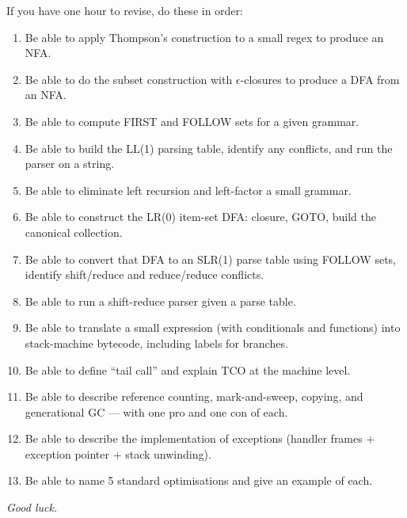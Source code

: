 \documentclass[11pt,a4paper]{article}
\begin{document}
\begin{must}
If you have one hour to revise, do these in order:
\begin{enumerate}[leftmargin=*,itemsep=2pt]
  \item Be able to apply Thompson's construction to a small regex to produce an NFA.
  \item Be able to do the subset construction with $\epsilon$-closures to produce a DFA from an NFA.
  \item Be able to compute FIRST and FOLLOW sets for a given grammar.
  \item Be able to build the LL(1) parsing table, identify any conflicts, and run the parser on a string.
  \item Be able to eliminate left recursion and left-factor a small grammar.
  \item Be able to construct the LR(0) item-set DFA: closure, GOTO, build the canonical collection.
  \item Be able to convert that DFA to an SLR(1) parse table using FOLLOW sets, identify shift/reduce and reduce/reduce conflicts.
  \item Be able to run a shift-reduce parser given a parse table.
  \item Be able to translate a small expression (with conditionals and functions) into stack-machine bytecode, including labels for branches.
  \item Be able to define ``tail call'' and explain TCO at the machine level.
  \item Be able to describe reference counting, mark-and-sweep, copying, and generational GC --- with one pro and one con of each.
  \item Be able to describe the implementation of exceptions (handler frames + exception pointer + stack unwinding).
  \item Be able to name 5 standard optimisations and give an example of each.
\end{enumerate}
\end{must}

\vspace{0.4cm}
\begin{center}
\textit{Good luck.}
\end{center}
\end{document}
